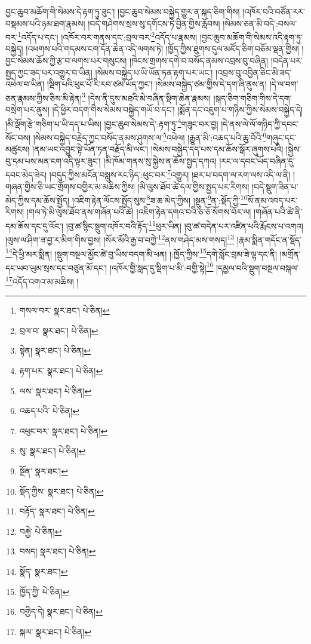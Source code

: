 བྱང་ཆུབ་མཆོག་གི་སེམས་དེ་རྟག་ཏུ་ཟུང་། །བྱང་ཆུབ་སེམས་བསྐྱེད་གྱུར་ན་སྐད་ཅིག་གིས། །འཁོར་བའི་བཙོན་རར་བསྡམས་པའི་ཉམ་ཐག་རྣམས། །བདེ་གཤེགས་སྲས་སུ་དགོངས་ཏེ་བྱིན་གྱིས་རློབས། །སེམས་ཅན་མི་བདེ་:བསལ་བར་\footnote{གསལ་བར་  སྣར་ཐང་།  པེ་ཅིན། }འདོད་པ་དང་། །འཁོར་བར་གནས་དང་:བྲལ་བར་\footnote{བྲལ་བ་  སྣར་ཐང་།  པེ་ཅིན། }འདོད་པ་རྣམས། །བྱང་ཆུབ་མཆོག་གི་སེམས་འདི་རྟག་ཏུ་བསྐྱེད། །འཕགས་པའི་གདམས་ངག་དོན་ཆེན་འདི་ལགས་ཏེ། །ཁྱོད་ཀྱིས་ཐུགས་དུལ་མཛོད་ཅིག་བཅོམ་ལྡན་གྱིས། །བྱང་སེམས་ཆོས་ཀྱི་རྩ་བ་ལགས་པར་གསུངས། །ཁེངས་གྲགས་དགེ་བ་བསོད་ནམས་འབྲས་བུ་བཞིན། །བདེན་པར་སྤྱད་ཀྱང་ཟད་པར་འགྱུར་བ་ཡིན། །སེམས་བསྐྱེད་པ་ཡི་ཡོན་ཏན་རྟག་པར་ཡང་། །འབྲས་བུ་འབྱིན་ཅིང་མི་ཟད་འཕེལ་བ་ཡིན། །སྡིག་པའི་ཕུང་པོ་རི་རབ་ཙམ་ཡོད་ཀྱང་། །སེམས་བསྐྱེད་ཙམ་གྱིས་དེ་དག་ཞི་ནུས་ན། །དེ་ལ་བག་ཅན་རྣམས་ཀྱིས་ཅིས་མི་རྟེན།\footnote{སྟེན།  སྣར་ཐང་།  པེ་ཅིན། } །དེས་ནི་དུས་མཐའི་མེ་བཞིན་སྡིག་ཆེན་རྣམས། །སྐད་ཅིག་གཅིག་གིས་དེ་དག་བསྲེག་པར་ནུས། །དེ་ཕྱིར་བདག་གིས་སེམས་བསྐྱེད་གཡོ་བ་དང་། །སྨོན་དང་འཇུག་པ་གཉིས་ཀྱིས་སེམས་བསྐྱེད་དེ། །མི་ལྡོག་རྩེ་གཅིག་པ་ཡི་དད་པ་ཡིས། །བྱང་ཆུབ་སེམས་དེ་:རྟག་ཏུ་\footnote{རྟག་པར་  སྣར་ཐང་།  པེ་ཅིན། }གཟུང་བར་བྱ། །དེ་ནས་ལེ་ལོ་གཉིད་ཀྱི་དབང་སོང་བས། །སེམས་བསྐྱེད་བརྗེད་ཀྱང་བསོད་ནམས་ཤུགས་ལ་\footnote{ལས་  སྣར་ཐང་།  པེ་ཅིན། }འཕེལ། །རྒྱུན་མི་:འཆད་པའི་ཆུ་བོའི་\footnote{འཆད་པའི་  པེ་ཅིན། }གཞུང་དང་མཚུངས། །ནམ་ཡང་འབྱུང་སྟེ་ཡོན་ཏན་བརྗོད་མི་ལང་། །སེམས་བསྐྱེད་དད་པས་དམ་ཆོས་སྒོར་ཞུགས་པའི། །སྐྱེས་བུ་དམ་པས་མན་ངག་འདི་ལྟར་ཟུང་། །མི་ཁོམ་གནས་སུ་སྐྱེས་ན་ཆོས་སྤྱད་དཀའ། །རང་ལ་དབང་ཡོད་བཞིན་དུ་དབང་མེད་ཟེར། །བདུད་ཀྱིས་མངོན་བསླུས་རང་ཉིད་:ཕུང་བར་\footnote{འཕུང་བར་  སྣར་ཐང་།  པེ་ཅིན། }འགྱུར། །ཐར་པ་བདག་ལ་རག་ལས་འདི་ལ་ནི། །གཞན་གྱིས་ཅི་ཡང་གྲོགས་བགྱིར་མ་མཆིས་ཀྱིས། །མི་ལུས་ཐོབ་ཚེ་དལ་གྱིས་སྤྱད་པར་རིགས། །བདེ་སྡུག་ཟིན་པ་མེད་ཀྱིས་དམ་ཆོས་སྤྱོད། །འཇིག་རྟེན་ལོངས་སྤྱོད་སུས་\footnote{སུ་  སྣར་ཐང་།  པེ་ཅིན། }ཟ་ཆ་མེད་ཀྱིས། །སྔུན་\footnote{སྔོན་  སྣར་ཐང་། }ན་:སྡོད་ཀྱི་\footnote{སྡོད་ཀྱིས་  སྣར་ཐང་།  པེ་ཅིན། }སོ་ནམ་འབད་པར་རིགས། །གལ་ཏེ་མི་ལུས་ཐོབ་ནས་གཞོན་པའི་ཚེ། །འཇིག་རྟེན་དགའ་བའི་ཅ་ཅོ་སོགས་བོར་ལ། །གཞོན་པའི་ཚེ་ནི་དམ་ཆོས་དང་དུ་ལོང་། །བུ་ཚ་སྙིང་སྡུག་འཁོར་བའི་རྟོད་\footnote{བརྟོད་  སྣར་ཐང་།  པེ་ཅིན། }ཕུར་ཡིན། །བུ་ཚ་བདེན་པར་འཛིན་པའི་རྨོངས་པ་འགའ། །ལུས་ལ་ཤིག་ཟ་བྱ་ར་མིག་གིས་བྱས། །སོར་མོའི་རྒྱ་བ་བཀྱེ་\footnote{བརྐྱེ་  པེ་ཅིན། }ནས་གཤེད་མས་གསད།\footnote{བསད།  སྣར་ཐང་།  པེ་ཅིན། } །རྣམ་སྨིན་གདོང་ན་སྡོད་\footnote{སྣོད་  སྣར་ཐང་། }དེ་ཕྱི་མར་སྨིན། །སྡུག་བསྔལ་མྱོང་ཚེ་བུ་ཡིས་བདག་མི་ཕན། །:ཁྱོད་ཀྱིས་\footnote{ཁྱོད་ཀྱི་  པེ་ཅིན། }དགེ་སློང་བྲམ་ཟེ་ལྷ་དང་ནི། །མགྲོན་དང་ཡབ་ཡུམ་སྲས་དང་བཙུན་མོ་དང་། །འཁོར་གྱི་སླད་དུ་སྡིག་པ་མི་:བགྱི་སྟེ།\footnote{བགྱིད་དེ།  སྣར་ཐང་།  པེ་ཅིན། } །དམྱལ་བའི་སྡུག་བསྔལ་བསྐལ་\footnote{སྐལ་  སྣར་ཐང་།  པེ་ཅིན། }འདོད་འགའ་མ་མཆིས། །
